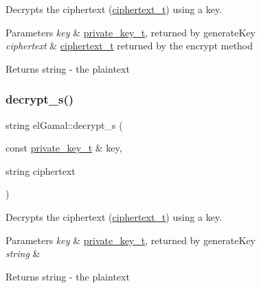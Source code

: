 Decrypts the ciphertext (\mbox{\hyperlink{structelGamal_1_1ciphertext__t}{ciphertext\+\_\+t}}) using a key. 


\begin{DoxyParams}{Parameters}
{\em key} & \mbox{\hyperlink{structelGamal_1_1private__key__t}{private\+\_\+key\+\_\+t}}, returned by generate\+Key \\
\hline
{\em ciphertext} & \mbox{\hyperlink{structelGamal_1_1ciphertext__t}{ciphertext\+\_\+t}} returned by the encrypt method\\
\hline
\end{DoxyParams}
\begin{DoxyReturn}{Returns}
string -\/ the plaintext 
\end{DoxyReturn}
\mbox{\label{namespaceelGamal_a91138d747c43e157f27fe43d0f338808}} 
\subsubsection{\texorpdfstring{decrypt\+\_\+s()}{decrypt\_s()}}
{\footnotesize\ttfamily string el\+Gamal\+::decrypt\+\_\+s (\begin{DoxyParamCaption}\item[{const \mbox{\hyperlink{structelGamal_1_1private__key__t}{private\+\_\+key\+\_\+t}} \&}]{key,  }\item[{string}]{ciphertext }\end{DoxyParamCaption})}



Decrypts the ciphertext (\mbox{\hyperlink{structelGamal_1_1ciphertext__t}{ciphertext\+\_\+t}}) using a key. 


\begin{DoxyParams}{Parameters}
{\em key} & \mbox{\hyperlink{structelGamal_1_1private__key__t}{private\+\_\+key\+\_\+t}}, returned by generate\+Key \\
\hline
{\em string} & \\
\hline
\end{DoxyParams}
\begin{DoxyReturn}{Returns}
string -\/ the plaintext 
\end{DoxyReturn}
\mbox{\label{namespaceelGamal_aea2534e80b8368b1dd998cff835ef643}} 
